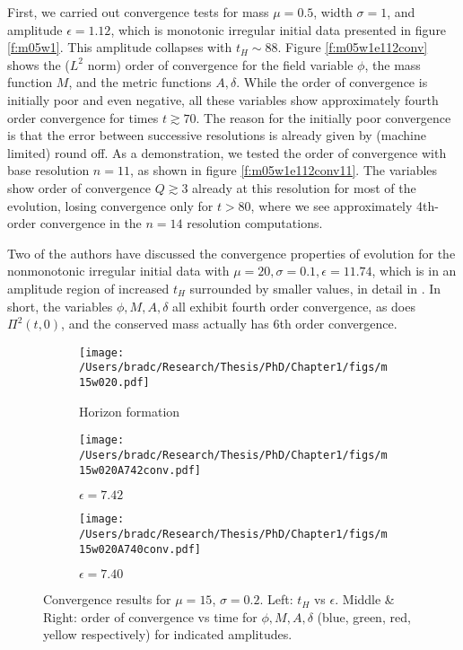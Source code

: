 \documentclass[../PhD.tex]{subfiles}
\begin{document}
\begin{subappendices}
First, we carried out convergence tests for mass $\mu=0.5$, width
$\sigma=1$, and amplitude $\epsilon=1.12$, which is monotonic irregular
initial data presented in figure \ref{f:m05w1}.  
This amplitude collapses with $t_H\sim 88$. Figure \ref{f:m05w1e112conv}
shows the ($L^2$ norm) order of convergence for the field variable 
$\phi$, the mass 
function $M$, and the metric functions $A,\delta$.  While the order of
convergence is initially poor and even negative, all these variables show
approximately fourth order convergence for times $t\gtrsim 70$.  The 
reason for the initially poor convergence is that the error between 
successive resolutions is already given by (machine limited) round off.
As a demonstration, we tested the order of convergence
with base resolution $n=11$, as shown in figure \ref{f:m05w1e112conv11}.
The variables show order of convergence $Q\gtrsim 3$ already at this resolution
for most of the evolution, losing convergence only for $t>80$, where we
see approximately 4th-order convergence in the $n=14$ resolution
computations.

Two of the authors have discussed the convergence properties of evolution for
the nonmonotonic irregular initial data with 
$\mu=20,\sigma=0.1,\epsilon=11.74$, which is in an amplitude region of 
increased $t_H$ surrounded by smaller values, in detail in \cite{1508.02709}.
In short, the variables $\phi,M,A,\delta$ all exhibit fourth order 
convergence, as does $\Pi^2(t,0)$, and the conserved mass actually has 6th 
order convergence.  

\begin{figure}[!t]
\centering
\begin{subfigure}[t]{0.31\textwidth}
\texttt{[image: /Users/bradc/Research/Thesis/PhD/Chapter1/figs/m15w020.pdf]}
\caption{Horizon formation}
\label{f:m15w020}
\end{subfigure}
\begin{subfigure}[t]{0.31\textwidth}
\texttt{[image: /Users/bradc/Research/Thesis/PhD/Chapter1/figs/m15w020A742conv.pdf]}
\caption{$\epsilon=7.42$}
\label{f:m15w020A742conv}
\end{subfigure}
\begin{subfigure}[t]{0.31\textwidth}
\texttt{[image: /Users/bradc/Research/Thesis/PhD/Chapter1/figs/m15w020A740conv.pdf]}
\caption{$\epsilon=7.40$}
\label{f:m15w020A740conv}
\end{subfigure}
\caption[Order of convergence for $\phi$, $M$, $A$, $\delta$ as a function of time for $\mu = 15$ at nearby amplitudes]{Convergence results for $\mu=15$, $\sigma=0.2$.
Left: $t_H$ vs $\epsilon$.  Middle \& Right: order of convergence vs time 
for $\phi,M,A,\delta$ (blue, green, red, yellow respectively)
for indicated amplitudes.
}
\label{f:m15w020convergence}
\end{figure}


\end{subappendices}
\end{document}
